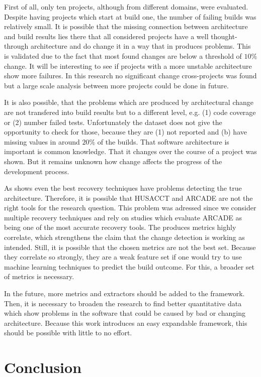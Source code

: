 \documentclass[conference]{IEEEtran}
\begin{document}
First of all, only ten projects, although from different domains, were evaluated. Despite having projects which start at build one, the number of failing builds was relatively small. It is possible that the missing connection between architecture and build results lies there that all considered projects have a well thought-through architecture and do change it in a way that in produces problems. This is validated due to the fact that most found changes are below a threshold of $10\%$ change. It will be interesting to see if projects with a more unstable architecture show more failures. In this research no significant change cross-projects was found but a large scale analysis between more projects could be done in future. 

It is also possible, that the problems which are produced by architectural change are not transfered into build results but to a different level, e.g. (1) code coverage or (2) number failed tests. Unfortunately the dataset does not give the opportunity to check for those, because they are (1) not reported and (b) have missing values in around $20\%$ of the builds. That software architecture is important is common knowledge. That it changes over the course of a project was shown. But it remains unknown how change affects the progress of the development process.

As \cite{arcRec-comparison} shows even the best recovery techniques have problems detecting the true architecture. Therefore, it is possible that HUSACCT and ARCADE are not the right tools for the research question. This problem was adressed since we consider multiple recovery techniques and rely on studies which evaluate ARCADE as being one of the most accurate recovery tools. The produces metrics highly correlate, which strengthens the claim that the change detection is working as intended. Still, it is possible that the chosen metrics are not the best set. Because they correlate so strongly, they are a weak feature set if one would try to use machine learning techniques to predict the build outcome. For this, a broader set of metrics is necessary. 

In the future, more metrics and extractors should be added to the framework. Then, it is necessary to broaden the research to find better quantitative data which show problems in the software that could be caused by bad or changing architecture. Because this work introduces an easy expandable framework, this should be possible with little to no effort.

\section{Conclusion}
\end{document}
